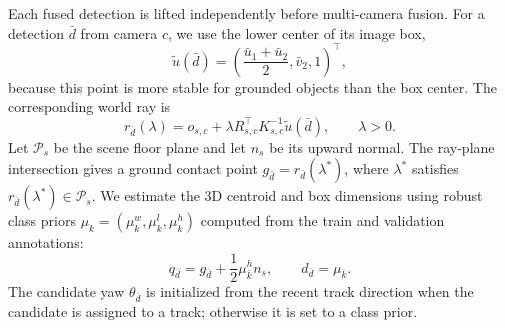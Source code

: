 \documentclass[runningheads]{llncs}
\begin{document}
Each fused detection is lifted independently before multi-camera fusion. For a
detection $\bar{d}$ from camera $c$, we use the lower center of its image box,
\begin{equation}
    \tilde{u}(\bar{d})
    =
    \left(\frac{\bar{u}_1+\bar{u}_2}{2},\bar{v}_2,1\right)^{\top},
    \label{eq:lower_center}
\end{equation}
because this point is more stable for grounded objects than the box center. The
corresponding world ray is
\begin{equation}
    r_{\bar{d}}(\lambda)
    =
    o_{s,c}
    +
    \lambda R_{s,c}^{\top}K_{s,c}^{-1}\tilde{u}(\bar{d}),
    \qquad \lambda>0.
    \label{eq:world_ray}
\end{equation}
Let $\mathcal{P}_{s}$ be the scene floor plane and let $n_s$ be its upward normal.
The ray-plane intersection gives a ground contact point
$g_{\bar{d}}=r_{\bar{d}}(\lambda^{*})$, where
$\lambda^{*}$ satisfies $r_{\bar{d}}(\lambda^{*})\in\mathcal{P}_{s}$. We estimate
the 3D centroid and box dimensions using robust class priors
$\mu_k=(\mu_k^w,\mu_k^l,\mu_k^h)$ computed from the train and validation
annotations:
\begin{equation}
    q_{\bar{d}}
    =
    g_{\bar{d}}+\frac{1}{2}\mu_{\bar{k}}^{h}n_s,
    \qquad
    d_{\bar{d}}=\mu_{\bar{k}}.
    \label{eq:prior_lifting}
\end{equation}
The candidate yaw $\theta_{\bar{d}}$ is initialized from the recent track direction
when the candidate is assigned to a track; otherwise it is set to a class prior.
\end{document}
